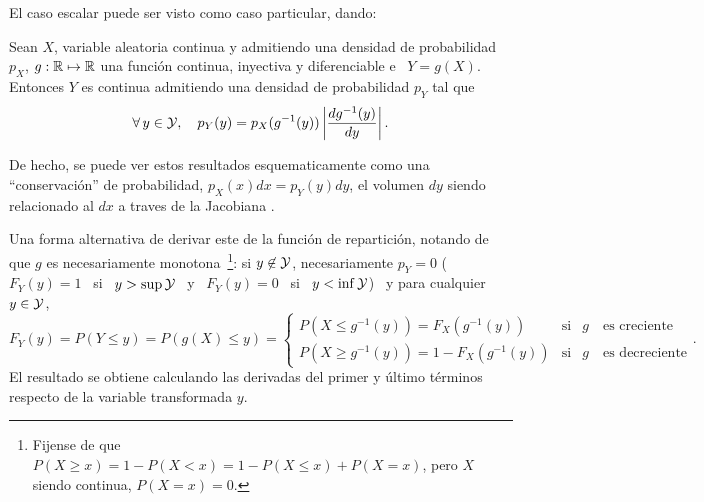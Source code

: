 El caso escalar puede ser visto como caso particular, dando:
%
\begin{corolario}
  Sean  $X$,   variable  aleatoria  continua   y  admitiendo  una   densidad  de
  probabilidad $p_X$, $g:\mathbb{R} \mapsto  \mathbb{R}$ una funci\'on continua, inyectiva
  y  diferenciable e  \ $Y  = g(X)$.   Entonces $Y$  es continua  admitiendo una
  densidad de probabilidad $p_Y$ tal que
  \[
  \forall  \,   y  \in  \mathcal{Y},   \quad  p_Y(y)  =  p_X(g^{-1}(y))   \left|  \frac{d
      g^{-1}(y)}{dy} \right|.
  \]
\end{corolario}
%
\noindent  De hecho,  se puede  ver estos  resultados esquematicamente  como una
``conservaci\'on'' de  probabilidad, $p_X(x)  dx = p_Y(y)  dy$, el  volumen $dy$
siendo  relacionado  al  $dx$ a  traves  de  la  Jacobiana .

Una forma alternativa de derivar  este  de la
funci\'on   de   repartici\'on,   notando   de   que   $g$   es   necesariamente
monotona~\footnote{Fijense de que $P(X \ge x) = 1 -  P(X < x) = 1 - P(X \le x) +
  P(X =  x)$, pero $X$ siendo  continua, $ P(X =  x) = 0$.}: si  $y \not\in \mathcal{Y}$,
necesariamente $p_Y = 0$ ($F_Y(y) = 1$ \ si \ $y > \sup \mathcal{Y}$ \ y \ $F_Y(y) = 0$ \
si \ $y < \inf \mathcal{Y}$) \ y para cualquier \ $y \in \mathcal{Y}$,
%
\[
F_Y(y) = P(Y \le y) = P(g(X) \le y) =
\left\{\begin{array}{lll}
P(X \le g^{-1}(y)) = F_X(g^{-1}(y)) & \mbox{si} & g \quad \mbox{es creciente}\\[2.5mm]
%
P(X \ge g^{-1}(y)) = 1 - F_X(g^{-1}(y)) & \mbox{si} & g \quad \mbox{es decreciente}
\end{array}\right..
\]
%
El  resultado  se  obtiene  calculando  las  derivadas  del  primer  y  \'ultimo
t\'erminos respecto de la variable transformada $y$.

